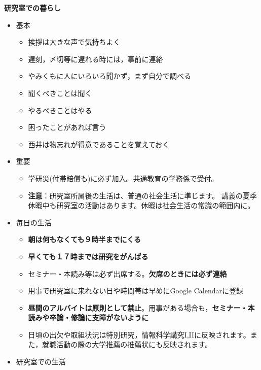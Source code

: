 \documentclass[11pt, ]{jsarticle}
\providecommand{\tightlist}{%
   \setlength{\itemsep}{0pt}\setlength{\parskip}{0pt}}
\begin{document}
\noindent
\begin{center}
  \textbf{\LARGE 研究室での暮らし}
\end{center}
  

\begin{itemize}
\tightlist
\item
  基本

  \begin{itemize}
  \tightlist
  \item
    挨拶は大きな声で気持ちよく
  \item
    遅刻，〆切等に遅れる時には，事前に連絡
  \item
    やみくもに人にいろいろ聞かず，まず自分で調べる
  \item
    聞くべきことは聞く
  \item
    やるべきことはやる
  \item
    困ったことがあれば言う
  \item
    西井は物忘れが得意であることを覚えておく
  \end{itemize}
\item
  重要

  \begin{itemize}
  \tightlist
  \item
    学研災(付帯賠償も)に必ず加入。共通教育の学務係で受付。
  \item
    \textbf{注意}：研究室所属後の生活は、普通の社会生活に準じます。
    講義の夏季休暇中も研究室の活動はあります。休暇は社会生活の常識の範囲内に。
  \end{itemize}
\item
  毎日の生活

  \begin{itemize}
  \tightlist
  \item
    \textbf{朝は何もなくても９時半までにくる}
  \item
    \textbf{早くても１７時までは研究をがんばる}
  \item
    セミナー・本読み等は必ず出席する。\textbf{欠席のときには必ず連絡}
  \item
    用事で研究室に来れない日や時間帯は早めにGoogle Calendarに登録
  \item
    \textbf{昼間のアルバイトは原則として禁止}。用事がある場合も，\textbf{セミナー・本読みや卒論・修論に支障がないように}
  \item
    日頃の出欠や取組状況は特別研究，情報科学講究I,IIに反映されます。また，就職活動の際の大学推薦の推薦状にも反映されます。
  \end{itemize}
\item
  研究室での生活


\end{itemize}
\end{document}
